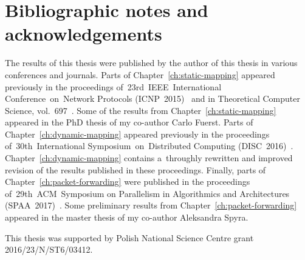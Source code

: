 \section{Bibliographic notes and acknowledgements}

The results of this thesis were published by the author of this thesis in various conferences and journals.
Parts of Chapter~\ref{ch:static-mapping} appeared previously in the proceedings of~23rd~IEEE~International Conference~on~Network Protocols (ICNP~2015)~\cite{my-icnp}
and in Theoretical Computer Science, vol.~697~\cite{my-tcs}.
Some of the results from Chapter~\ref{ch:static-mapping} appeared in the PhD thesis of my co-author Carlo Fuerst.
Parts of Chapter~\ref{ch:dynamic-mapping} appeared previously in the proceedings of~30th~International Symposium~on~Distributed Computing (DISC~2016)~\cite{my-disc}.
Chapter~\ref{ch:dynamic-mapping} contains a~throughly rewritten and improved revision of the results published in these proceedings.
Finally, parts of Chapter~\ref{ch:packet-forwarding} were published in the proceedings of~29th~ACM~Symposium on Parallelism in Algorithmics and Architectures (SPAA~2017)~\cite{my-spaa}.
Some preliminary results from Chapter~\ref{ch:packet-forwarding} appeared in the master thesis of my co-author Aleksandra Spyra.

This thesis was supported by Polish National Science Centre grant 2016/23/N/ST6/03412.

